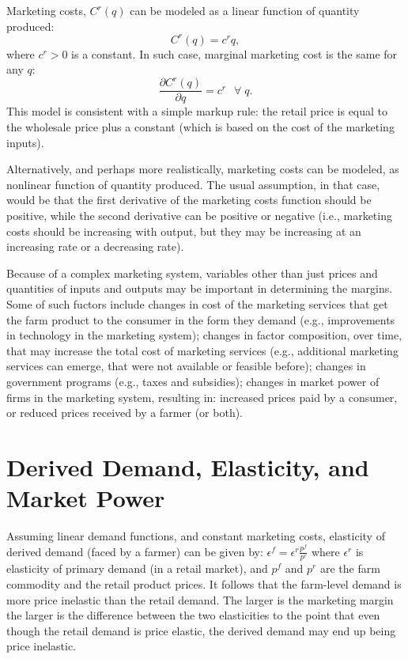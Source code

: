 \documentclass[]{book}
\begin{document}
Marketing costs, \(C^r(q)\) can be modeled as a linear function of
quantity produced: \[C^r(q) = c^r q,\] where \(c^r > 0\) is a constant.
In such case, marginal marketing cost is the same for any \(q\):
\[\frac{\partial C^r(q)}{\partial q} = c^r\;~~\forall\;q.\] This model
is consistent with a simple markup rule: the retail price is equal to
the wholesale price plus a constant (which is based on the cost of the
marketing inputs).

Alternatively, and perhaps more realistically, marketing costs can be
modeled, as nonlinear function of quantity produced. The usual
assumption, in that case, would be that the first derivative of the
marketing costs function should be positive, while the second derivative
can be positive or negative (i.e., marketing costs should be increasing
with output, but they may be increasing at an increasing rate or a
decreasing rate).

Because of a complex marketing system, variables other than just prices
and quantities of inputs and outputs may be important in determining the
margins. Some of such fuctors include changes in cost of the marketing
services that get the farm product to the consumer in the form they
demand (e.g., improvements in technology in the marketing system);
changes in factor composition, over time, that may increase the total
cost of marketing services (e.g., additional marketing services can
emerge, that were not available or feasible before); changes in
government programs (e.g., taxes and subsidies); changes in market power
of firms in the marketing system, resulting in: increased prices paid by
a consumer, or reduced prices received by a farmer (or both).

\section{Derived Demand, Elasticity, and Market
Power}\label{derived-demand-elasticity-and-market-power}

Assuming linear demand functions, and constant marketing costs,
elasticity of derived demand (faced by a farmer) can be given by:
\(\epsilon^f = \epsilon^r\frac{p^f}{p^r}\) where \(\epsilon^r\) is
elasticity of primary demand (in a retail market), and \(p^f\) and
\(p^r\) are the farm commodity and the retail product prices. It follows
that the farm-level demand is more price inelastic than the retail
demand. The larger is the marketing margin the larger is the difference
between the two elasticities to the point that even though the retail
demand is price elastic, the derived demand may end up being price
inelastic.
\end{document}
